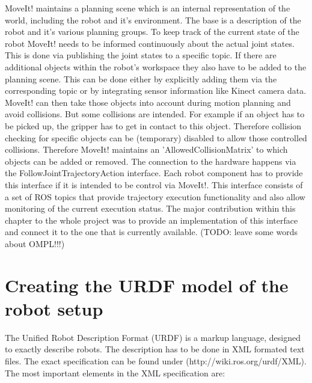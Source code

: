 MoveIt! maintains a planning scene which is an internal representation of the world, including the robot and it's environment. The base is a description of the robot and it's various planning groups. To keep track of the current state of the robot MoveIt! needs to be informed continuously about the actual joint states. This is done via publishing the joint states to a specific topic. If there are additional objects within the robot's workspace they also have to be added to the planning scene. This can be done either by explicitly adding them via the corresponding topic or by integrating sensor information like Kinect camera data. MoveIt! can then take those objects into account during motion planning and avoid collisions. But some collisions are intended. For example if an object has to be picked up, the gripper has to get in contact to this object. Therefore collision checking for specific objects can be (temporary) disabled to allow those controlled collisions. Therefore MoveIt! maintains an 'AllowedCollisionMatrix' to which objects can be added or removed. The connection to the hardware happens via the FollowJointTrajectoryAction interface. Each robot component has to provide this interface if it is intended to be control via MoveIt!. This interface consists of a set of ROS topics that provide trajectory execution functionality and also allow monitoring of the current execution status. The major contribution within this chapter to the whole project was to provide an implementation of this interface and connect it to the one that is currently available.
(TODO: leave some words about OMPL!!!)

\section{Creating the URDF model of the robot setup}

The Unified Robot Description Format (URDF) is a markup language, designed to exactly describe robots. The description has to be done in XML formated text files. The exact specification can be found under (http://wiki.ros.org/urdf/XML). The most important elements in the XML specification are:

